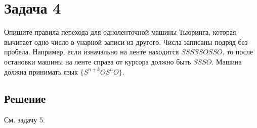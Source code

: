 \section{Задача 4}
Опишите правила перехода для одноленточной машины Тьюринга,
которая вычитает одно число в унарной записи из другого.
Числа записаны подряд без пробела.
Например, если изначально на ленте находится $SSSSSOSSO$,
то после остановки машины на ленте справа от
курсора должно быть $SSSO$.
Машина должна принимать язык $\{S^{n+k} O S^n O\}$.

\subsection{Решение}
См. задачу 5.
